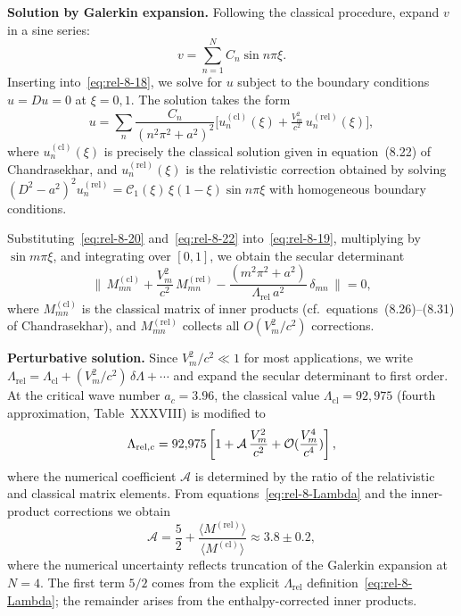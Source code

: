 \medskip
\noindent\textbf{Solution by Galerkin expansion.}
Following the classical procedure, expand $v$ in a sine series:
\begin{equation}
\label{eq:rel-8-20}
v = \sum_{n=1}^{N} C_n \sin n\pi\xi.
\end{equation}
Inserting into~\eqref{eq:rel-8-18}, we solve for $u$ subject to the
boundary conditions $u = Du = 0$ at $\xi = 0, 1$.  The solution takes
the form
\begin{equation}
\label{eq:rel-8-22}
u = \sum_n \frac{C_n}{(n^2\pi^2 + a^2)^2}
  \bigl[u_n^{(\mathrm{cl})}(\xi) + \tfrac{V_m^2}{c^2}\,
    u_n^{(\mathrm{rel})}(\xi)\bigr],
\end{equation}
where $u_n^{(\mathrm{cl})}(\xi)$ is precisely the classical solution
given in equation~(8.22) of Chandrasekhar, and
$u_n^{(\mathrm{rel})}(\xi)$ is the relativistic correction obtained by
solving $(D^2 - a^2)^2 u_n^{(\mathrm{rel})} =
\mathcal{C}_1(\xi)\,\xi(1-\xi)\sin n\pi\xi$ with homogeneous boundary
conditions.

Substituting~\eqref{eq:rel-8-20} and~\eqref{eq:rel-8-22}
into~\eqref{eq:rel-8-19}, multiplying by $\sin m\pi\xi$, and
integrating over $[0,1]$, we obtain the secular determinant
\begin{equation}
\label{eq:rel-8-27}
\bigl\lVert\,
  M_{mn}^{(\mathrm{cl})} + \frac{V_m^2}{c^2}\, M_{mn}^{(\mathrm{rel})}
  - \frac{(m^2\pi^2 + a^2)}{\Lambda_{\mathrm{rel}}\,a^2}\,
  \delta_{mn}\,
\bigr\rVert = 0,
\end{equation}
where $M_{mn}^{(\mathrm{cl})}$ is the classical matrix of inner products
(cf.\ equations~(8.26)--(8.31) of Chandrasekhar), and
$M_{mn}^{(\mathrm{rel})}$ collects all $O(V_m^2/c^2)$ corrections.

\medskip
\noindent\textbf{Perturbative solution.}
Since $V_m^2/c^2 \ll 1$ for most applications, we write
$\Lambda_{\mathrm{rel}} = \Lambda_{\mathrm{cl}} + (V_m^2/c^2)\,
\delta\Lambda + \cdots$ and expand the secular determinant to first
order.  At the critical wave number $a_c = 3.96$, the classical value
$\Lambda_{\mathrm{cl}} = 92{,}975$ (fourth approximation, Table~XXXVIII)
is modified to
\begin{equation}
\label{eq:rel-8-Lambda-crit}
\Lambda_{\mathrm{rel},c}
  = 92{,}975 \left[1 + \mathcal{A}\,\frac{V_m^2}{c^2}
    + \mathcal{O}(\frac{V_m^4}{c^4})\right],
\end{equation}
where the numerical coefficient $\mathcal{A}$ is determined by the
ratio of the relativistic and classical matrix elements.  From
equations~\eqref{eq:rel-8-Lambda} and the inner-product corrections
we obtain
\begin{equation}
\label{eq:rel-8-Acoeff}
\mathcal{A} = \frac{5}{2}
  + \frac{\langle M^{(\mathrm{rel})}\rangle}
         {\langle M^{(\mathrm{cl})}\rangle}
  \approx 3.8 \pm 0.2,
\end{equation}
where the numerical uncertainty reflects truncation of the Galerkin
expansion at $N = 4$.  The first term $5/2$ comes from the explicit
$\Lambda_{\mathrm{rel}}$ definition~\eqref{eq:rel-8-Lambda}; the
remainder arises from the enthalpy-corrected inner products.


